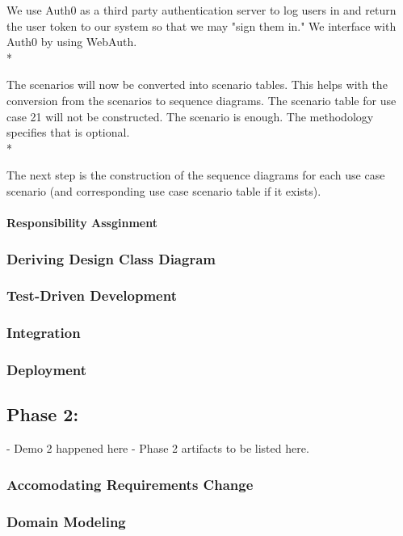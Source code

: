 \documentclass[11pt]{article}
\begin{document}
We use Auth0 as a third party authentication server to log users in and return the user token to our system so that we may "sign them in." We interface with Auth0 by using WebAuth.\\*

The scenarios will now be converted into scenario tables. This helps with the conversion from the scenarios to sequence diagrams. The scenario table for use case 21 will not be constructed. The scenario is enough. The methodology specifies that is optional. \\*

The next step is the construction of the sequence diagrams for each use case scenario (and corresponding use case scenario table if it exists).

\paragraph{Responsibility Assginment}
 
\subsubsection{Deriving Design Class Diagram}
 
\subsubsection{Test-Driven Development}
 
\subsubsection{Integration}
 
\subsubsection{Deployment}
\subsection{Phase 2:} 
 - Demo 2 happened here
 - Phase 2 artifacts to be listed here.

\subsubsection{Accomodating Requirements Change}
 
\subsubsection{Domain Modeling}
  
\end{document}
